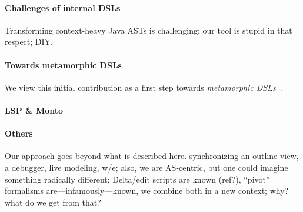 \paragraph{Challenges of internal DSLs}
Transforming context-heavy Java ASTs is challenging; our tool is stupid in that respect; DIY.

\paragraph{Towards metamorphic DSLs}
We view this initial contribution as a first step towards \emph{metamorphic DSLs}~\cite{acher2014metamorphic}.

\paragraph{LSP \& Monto}
\textbf{}

\paragraph{Others}
Our approach goes beyond what is described here. \eg synchronizing an outline view, a debugger, live modeling, w/e; also, we are AS-centric, but one could imagine something radically different;
Delta/edit scripts are known (ref?), ``pivot'' formalisms are---infamously---known, we combine both in a new context; why? what do we get from that?
